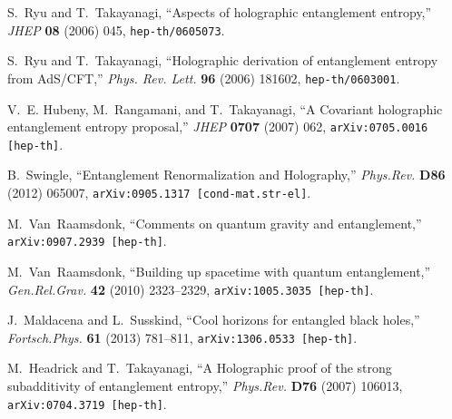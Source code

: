 \documentclass[12pt]{article}
\begin{document}
% 
% 
\providecommand{\href}[2]{#2}\begingroup\raggedright\begin{thebibliography}{10}

S.~Ryu and T.~Takayanagi, ``Aspects of holographic entanglement entropy,'' {\em
  JHEP} {\bf 08} (2006)  045,
\href{http://arxiv.org/abs/hep-th/0605073}{{\tt hep-th/0605073}}.

S.~Ryu and T.~Takayanagi, ``{Holographic derivation of entanglement entropy
  from AdS/CFT},'' {\em Phys. Rev. Lett.} {\bf 96} (2006)  181602,
\href{http://arxiv.org/abs/hep-th/0603001}{{\tt hep-th/0603001}}.

V.~E. Hubeny, M.~Rangamani, and T.~Takayanagi, ``{A Covariant holographic
  entanglement entropy proposal},''
  \href{http://dx.doi.org/10.1088/1126-6708/2007/07/062}{{\em JHEP} {\bf 0707}
  (2007)  062},
\href{http://arxiv.org/abs/0705.0016}{{\tt arXiv:0705.0016 [hep-th]}}.

B.~Swingle, ``{Entanglement Renormalization and Holography},''
  \href{http://dx.doi.org/10.1103/PhysRevD.86.065007}{{\em Phys.Rev.} {\bf D86}
  (2012)  065007},
\href{http://arxiv.org/abs/0905.1317}{{\tt arXiv:0905.1317 [cond-mat.str-el]}}.

M.~Van~Raamsdonk, ``{Comments on quantum gravity and entanglement},''
\href{http://arxiv.org/abs/0907.2939}{{\tt arXiv:0907.2939 [hep-th]}}.

M.~Van~Raamsdonk, ``{Building up spacetime with quantum entanglement},''
  \href{http://dx.doi.org/10.1007/s10714-010-1034-0,
  10.1142/S0218271810018529}{{\em Gen.Rel.Grav.} {\bf 42} (2010)  2323--2329},
\href{http://arxiv.org/abs/1005.3035}{{\tt arXiv:1005.3035 [hep-th]}}.

J.~Maldacena and L.~Susskind, ``{Cool horizons for entangled black holes},''
  \href{http://dx.doi.org/10.1002/prop.201300020}{{\em Fortsch.Phys.} {\bf 61}
  (2013)  781--811},
\href{http://arxiv.org/abs/1306.0533}{{\tt arXiv:1306.0533 [hep-th]}}.

M.~Headrick and T.~Takayanagi, ``{A Holographic proof of the strong
  subadditivity of entanglement entropy},''
  \href{http://dx.doi.org/10.1103/PhysRevD.76.106013}{{\em Phys.Rev.} {\bf D76}
  (2007)  106013},
\href{http://arxiv.org/abs/0704.3719}{{\tt arXiv:0704.3719 [hep-th]}}.


\end{thebibliography}
\end{document}
